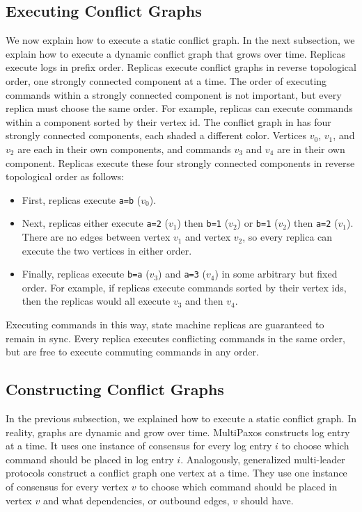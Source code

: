 {}

\subsection{Executing Conflict Graphs}
We now explain how to execute a static conflict graph. In the next subsection,
we explain how to execute a dynamic conflict graph that grows over time.
%
Replicas execute logs in prefix order. Replicas execute conflict graphs in
reverse topological order, one strongly connected component at a time.  The
order of executing commands within a strongly connected component is not
important, but every replica must choose the same order. For example, replicas
can execute commands within a component sorted by their vertex id.
%
The conflict graph in  has four strongly connected
components, each shaded a different color. Vertices $v_0$, $v_1$, and $v_2$ are
each in their own components, and commands $v_3$ and $v_4$ are in their own
component. Replicas execute these four strongly connected components in reverse
topological order as follows:
\begin{itemize}
  \item
    First, replicas execute \texttt{a=b} ($v_0$).

  \item
    Next, replicas either execute \texttt{a=2} ($v_1$) then \texttt{b=1}
    ($v_2$) or \texttt{b=1} ($v_2$) then \texttt{a=2} ($v_1$). There are no
    edges between vertex $v_1$ and vertex $v_2$, so every replica can execute
    the two vertices in either order.

  \item
    Finally, replicas execute \texttt{b=a} ($v_3$) and \texttt{a=3} ($v_4$) in
    some arbitrary but fixed order. For example, if replicas execute commands
    sorted by their vertex ids, then the replicas would all execute $v_3$ and
    then $v_4$.
\end{itemize}
Executing commands in this way, state machine replicas are guaranteed to remain
in sync. Every replica executes conflicting commands in the same order, but are
free to execute commuting commands in any order.

\subsection{Constructing Conflict Graphs}
In the previous subsection, we explained how to execute a static conflict
graph. In reality, graphs are dynamic and grow over time. MultiPaxos constructs
%
 log entry at a time. It uses one instance of consensus for
every log entry $i$ to choose which command should be placed in log entry $i$.
Analogously, generalized multi-leader protocols construct a conflict graph one
vertex at a time. They use one instance of consensus for every vertex $v$ to
choose which command should be placed in vertex $v$ and what dependencies, or
outbound edges, $v$ should have.

